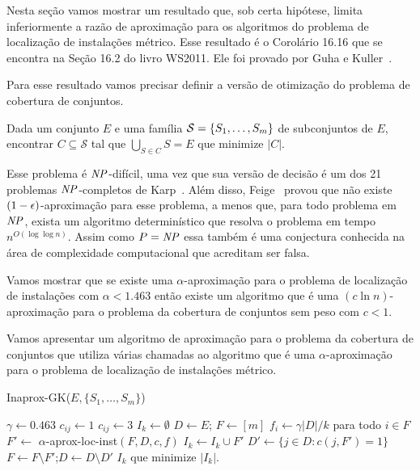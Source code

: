 Nesta seção vamos mostrar um resultado que, sob certa hipótese, limita inferiormente a razão de aproximação para os algoritmos do problema de localização de instalações métrico. Esse resultado é o Corolário 16.16 que se encontra na Seção 16.2 do livro WS2011. Ele foi provado por Guha e Kuller~\cite{GUHA1999228}.

Para esse resultado vamos precisar definir a versão de otimização do problema de cobertura de conjuntos.
\begin{problem}\label{otsetcover}
    Dada um conjunto $E$ e uma família ${\mathcal{S} = \{S_1,\ldots,S_m\}}$ de subconjuntos de $E$, encontrar $C \subseteq \mathcal{S}$ tal que $\bigcup_{S \in C} S = E$ que minimize $|C|$.
\end{problem}

Esse problema é $\mathit{NP}$-difícil, uma vez que sua versão de decisão é um dos 21 problemas $\mathit{NP}$-completos de Karp~\cite{Karp1972}. Além disso, Feige~\cite{Feige98} provou que não existe $(1-\epsilon)$-aproximação para esse problema, a menos que, para todo problema em $\mathit{NP}$, exista um algoritmo determinístico que resolva o problema em tempo $n^{O(\log\log n)}$. Assim como ${P = \mathit{NP}}$ essa também é uma conjectura conhecida na área de complexidade computacional que acreditam ser falsa.

Vamos mostrar que se existe uma $\alpha$-aproximação para o problema de localização de instalações com $\alpha < 1.463$ então existe um algoritmo que é uma $(c \ln n)$-aproximação para o problema da cobertura de conjuntos sem peso com $c<1$.

Vamos apresentar um algoritmo de aproximação para o problema da cobertura de conjuntos que utiliza várias chamadas ao algoritmo que é uma $\alpha$-aproximação para o problema de localização de instalações métrico. 

\begin{algorithm}
    \caption{\sc Inaprox-GK($E,\{S_1,\ldots,S_m\}$)}
    \begin{algorithmic}[1]
        \State $\gamma \gets 0.463$
            \State $c_{ij} \gets 1$
            \Else
            \State $c_{ij} \gets 3$
            \EndIf
            \EndFor
        \EndFor
            \State $I_k \gets \emptyset$
            \State $D \gets E$; \quad $F \gets [m]$
                \State $f_i \gets \gamma |D|/k$ para todo $i \in F$
                \State $F' \gets$ {\sc $\alpha$-aprox-loc-inst}$(F,D,c,f)$
                \State $I_k \gets I_k \cup F'$
                \State $D' \gets \{j \in D: c(j,F') = 1 \}$
                \State $F \gets F \setminus F'$;\quad $D\gets D\setminus D'$
            \EndWhile
        \EndFor
    \State \Return $I_k$ que minimize $|I_k|$.
    \end{algorithmic}
\end{algorithm}

